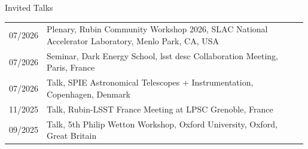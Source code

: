 \begin{rSection}{Invited Talks}
\setlength{\extrarowheight}{3pt}
    \begin{longtable}{p{0.1\linewidth}p{0.89\linewidth}}
    07/2026 & Plenary, Rubin Community Workshop 2026, SLAC National Accelerator Laboratory, Menlo Park, CA, USA\\
    07/2026 & Seminar, Dark Energy School, \ac{lsst} \ac{desc} Collaboration Meeting, Paris, France\\
    07/2026 & Talk, SPIE Astronomical Telescopes + Instrumentation, Copenhagen, Denmark\\
    11/2025 & Talk, Rubin-LSST France Meeting at LPSC Grenoble, France\\
    09/2025 & Talk, 5th Philip Wetton Workshop, Oxford University, Oxford, Great Britain\\
    \end{longtable}

\end{rSection}
